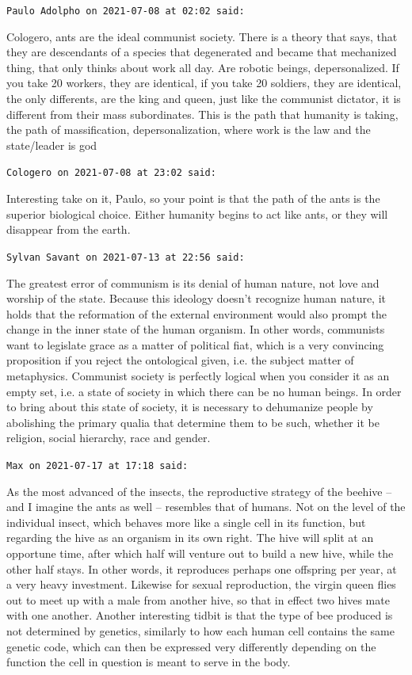 \begin{footnotesize}
\begin{sffamily}
\texttt{Paulo Adolpho on 2021-07-08 at 02:02 said:}

Cologero, ants are the ideal communist society. There is a theory that says, that they are descendants of a species that degenerated and became that mechanized thing, that only thinks about work all day. Are robotic beings, depersonalized. If you take 20 workers, they are identical, if you take 20 soldiers, they are identical, the only differents, are the king and queen, just like the communist dictator, it is different from their mass subordinates. This is the path that humanity is taking, the path of massification, depersonalization, where work is the law and the state/leader is god

\hfill

\texttt{Cologero on 2021-07-08 at 23:02 said:}

Interesting take on it, Paulo, so your point is that the path of the ants is the superior biological choice. Either humanity begins to act like ants, or they will disappear from the earth.

\hfill

\texttt{Sylvan Savant on 2021-07-13 at 22:56 said:}

The greatest error of communism is its denial of human nature, not love and worship of the state. Because this ideology doesn't recognize human nature, it holds that the reformation of the external environment would also prompt the change in the inner state of the human organism. In other words, communists want to legislate grace as a matter of political fiat, which is a very convincing proposition if you reject the ontological given, i.e. the subject matter of metaphysics. Communist society is perfectly logical when you consider it as an empty set, i.e. a state of society in which there can be no human beings. In order to bring about this state of society, it is necessary to dehumanize people by abolishing the primary qualia that determine them to be such, whether it be religion, social hierarchy, race and gender.

\hfill

\texttt{Max on 2021-07-17 at 17:18 said:}

As the most advanced of the insects, the reproductive strategy of the beehive -- and I imagine the ants as well -- resembles that of humans. Not on the level of the individual insect, which behaves more like a single cell in its function, but regarding the hive as an organism in its own right. The hive will split at an opportune time, after which half will venture out to build a new hive, while the other half stays. In other words, it reproduces perhaps one offspring per year, at a very heavy investment. Likewise for sexual reproduction, the virgin queen flies out to meet up with a male from another hive, so that in effect two hives mate with one another. Another interesting tidbit is that the type of bee produced is not determined by genetics, similarly to how each human cell contains the same genetic code, which can then be expressed very differently depending on the function the cell in question is meant to serve in the body.


\end{sffamily}
\end{footnotesize}
